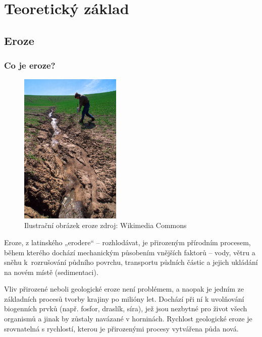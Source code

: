 \chapter{Teoretický základ}
\label{2-teorie}
\section{Eroze}
\subsection{Co je eroze?}
\begin{figure}
\vspace{-16pt} \centering
\includegraphics[width=0.43\textwidth]{./pictures/erosion.jpg}
\caption[Ilustrační obrázek eroze]{\label{erosion}Ilustrační obrázek
  eroze zdroj: Wikimedia Commons\cite{wikicommons}}
\vspace{-20pt}
\end{figure}
Eroze, z latinského „erodere“ – rozhlodávat, je přirozeným přírodním
procesem, během kterého dochází mechanickým působením vnějších faktorů
– vody, větru a sněhu k~rozrušování půdního povrchu, transportu
půdních částic a jejich ukládání na novém místě
(sedimentaci).\cite{Holy1994}

Vliv přirozené neboli geologické eroze není problémem, a naopak je
jedním ze základních procesů tvorby krajiny po milióny let. Dochází
při ní k uvolňování biogenních prvků (např. fosfor, draslík, síra),
jež jsou nezbytné pro život všech organismů a jinak by zůstaly
navázané v horninách. Rychlost geologické eroze je srovnatelná s
rychlostí, kterou je přirozenými procesy vytvářena půda
nová.\cite{Holy1994}

